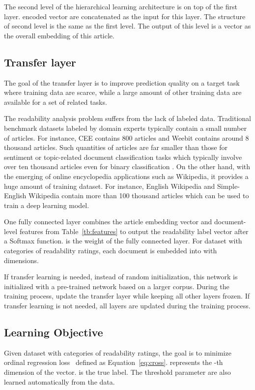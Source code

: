 \documentclass[runningheads]{llncs}
\begin{document}
The second level of the hierarchical learning architecture is on top of the first layer.  encoded vector  are concatenated as the input for this layer. The structure of second level is the same as the first level. The output of this level is a vector  as the overall embedding of this article.
 




\subsection{Transfer layer}


The goal of the transfer layer is to improve prediction quality on a target task where training data are scarce, while a large amount of other training data are available for a set of related tasks. 

The readability analysis problem suffers from the lack of labeled data. Traditional benchmark datasets labeled by domain experts typically contain a small number of articles. For instance, CEE contains 800 articles and Weebit contains around 8 thousand articles. 
Such quantities of articles are far smaller than those for sentiment or topic-related document classification tasks which typically involve over ten thousand articles even for binary classification \cite{CNN,chen2019subarticle}.
On the other hand, with the emerging of online encyclopedia applications such as Wikipedia, it provides a huge amount of training dataset. For instance, English Wikipedia and Simple-English Wikipedia contain more than 100 thousand articles which can be used to train a deep learning model.


One fully connected layer combines the article embedding vector  and document-level features  from Table~\ref{tb:features} to output the readability label vector  after a Softmax function.  is the weight of the fully connected layer. For dataset with  categories of readability ratings, each document is embedded into  with  dimensions. 


If transfer learning is needed, instead of random initialization, this network is initialized with a pre-trained network based on a larger corpus. During the training process, update the transfer layer while keeping all other layers frozen. If transfer learning is not needed, all layers are updated during the training process.

\subsection{Learning Objective}
Given dataset with  categories of readability ratings, the goal is to minimize ordinal regression loss~\cite{rennie2005loss} defined as Equation~\ref{eq:cross}.   represents the -th dimension of the  vector.  is the true label. The threshold parameter  are also learned automatically from the data.
\end{document}
